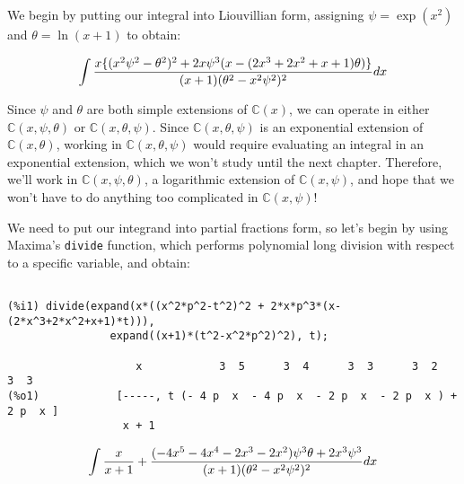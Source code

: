 We begin by putting our integral into Liouvillian form, assigning $\psi = \exp(x^2)$ and $\theta = \ln (x+1)$ to obtain:



$$\int{{x\{(x^2 \psi^2-\theta^2)^2+2x \psi^3(x-(2x^3+2x^2+x+1)\theta)\}}\over{(x+1)(\theta^2 - x^2\psi^2)^2}} dx$$

Since $\psi$ and $\theta$ are both simple extensions of ${\mathbb C}(x)$, we can operate in either
${\mathbb C}(x,\psi,\theta)$ or ${\mathbb C}(x,\theta,\psi)$.  Since ${\mathbb C}(x,\theta,\psi)$
is an exponential extension of ${\mathbb C}(x,\theta)$, working in ${\mathbb C}(x,\theta,\psi)$
would require evaluating an integral in an exponential extension, which we won't study until
the next chapter.  Therefore, we'll work in ${\mathbb C}(x,\psi,\theta)$, a logarithmic
extension of ${\mathbb C}(x,\psi)$, and hope that we won't have to do anything
too complicated in ${\mathbb C}(x,\psi)$!

We need to put our integrand into partial fractions form, so let's begin by
using Maxima's {\tt divide} function, which performs polynomial long division
with respect to a specific variable, and obtain:


{\small\begin{verbatim}

(%i1) divide(expand(x*((x^2*p^2-t^2)^2 + 2*x*p^3*(x-(2*x^3+2*x^2+x+1)*t))),
                expand((x+1)*(t^2-x^2*p^2)^2), t);

                    x            3  5      3  4      3  3      3  2       3  3
(%o1)            [-----, t (- 4 p  x  - 4 p  x  - 2 p  x  - 2 p  x ) + 2 p  x ]
                  x + 1

\end{verbatim}}


$$\int {x\over{x+1}} + {{(-4x^5-4x^4-2x^3-2x^2)\psi^3\theta + {2x^3}\psi^3}\over{(x+1)(\theta^2 - x^2\psi^2)^2}} dx$$


